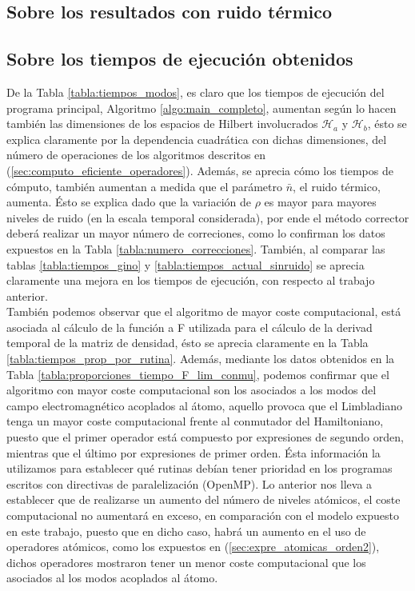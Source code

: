 \subsection{Sobre los resultados con ruido t\'ermico}
\subsection{Sobre los tiempos de ejecuci\'on obtenidos} \qquad De la Tabla \ref{tabla:tiempos_modos}, es claro que los tiempos de ejecuci\'on del programa principal, Algoritmo \ref{algo:main_completo}, aumentan seg\'un lo hacen tambi\'en las dimensiones de los espacios de Hilbert involucrados $\mathcal{H}_a$ y $\mathcal{H}_b$, \'esto se explica claramente por la dependencia cuadr\'atica con dichas dimensiones, del n\'umero de operaciones de los algoritmos descritos en (\ref{sec:computo_eficiente_operadores}). Adem\'as, se aprecia c\'omo los tiempos de c\'omputo, tambi\'en aumentan a medida que el par\'ametro $\bar{n}$, el ruido t\'ermico, aumenta. \'Esto se explica dado que la variaci\'on de $\rho$ es mayor para mayores niveles de ruido (en la escala temporal considerada), por ende el m\'etodo corrector deber\'a realizar un mayor n\'umero de correciones, como lo confirman los datos expuestos en la Tabla \ref{tabla:numero_correcciones}. Tambi\'en, al comparar las tablas \ref{tabla:tiempos_gino} y \ref{tabla:tiempos_actual_sinruido} se aprecia claramente una mejora en los tiempos de ejecuci\'on, con respecto al trabajo anterior.\\

\qquad Tambi\'en podemos observar que el algoritmo de mayor coste computacional, est\'a asociada al c\'alculo de la funci\'on a F utilizada para el c\'alculo de la derivad temporal de la matriz de densidad, \'esto se aprecia claramente en la Tabla \ref{tabla:tiempos_prop_por_rutina}. Adem\'as, mediante los datos obtenidos en la Tabla \ref{tabla:proporciones_tiempo_F_lim_conmu}, podemos confirmar que el algoritmo con mayor coste computacional son los asociados a los modos del campo electromagn\'etico acoplados al \'atomo, aquello provoca que el Limbladiano tenga un mayor coste computacional frente al conmutador del Hamiltoniano, puesto que el primer operador est\'a compuesto por expresiones de segundo orden, mientras que el \'ultimo por expresiones de primer orden. \'Esta informaci\'on la utilizamos para establecer qu\'e rutinas deb\'ian tener prioridad en los programas escritos con directivas de paralelizaci\'on (OpenMP). Lo anterior nos lleva a establecer que de realizarse un aumento del n\'umero de niveles at\'omicos, el coste computacional no aumentar\'a en exceso, en comparaci\'on con el modelo expuesto en este trabajo, puesto que en dicho caso, habr\'a un aumento en el uso de operadores at\'omicos, como los expuestos en (\ref{sec:expre_atomicas_orden2}), dichos operadores mostraron tener un menor coste computacional que los asociados al los modos acoplados al \'atomo.\\

